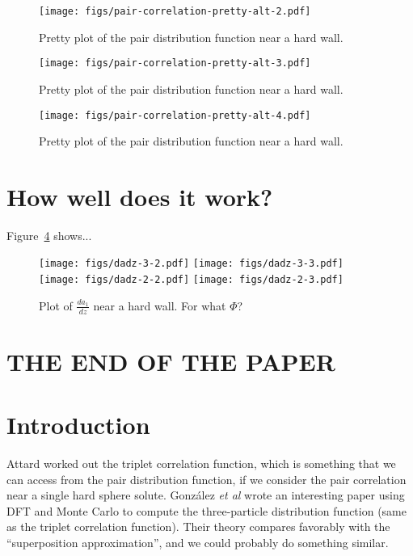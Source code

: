 \documentclass[letterpaper,twocolumn,amsmath,amssymb,pre]{revtex4-1}
\begin{document}
\begin{figure}
  \texttt{[image: figs/pair-correlation-pretty-alt-2.pdf]}
  \caption{Pretty plot of the pair distribution function near a hard
    wall.}\label{fig:pair-distribution-2}
\end{figure}
\begin{figure}
  \texttt{[image: figs/pair-correlation-pretty-alt-3.pdf]}
  \caption{Pretty plot of the pair distribution function near a hard
    wall.}\label{fig:pair-distribution-3}
\end{figure}
\begin{figure}
  \texttt{[image: figs/pair-correlation-pretty-alt-4.pdf]}
  \caption{Pretty plot of the pair distribution function near a hard
    wall.}\label{fig:pair-distribution-4}
\end{figure}

\section{How well does it work?}
Figure~\ref{fig:dadz} shows...
\begin{figure}
  \texttt{[image: figs/dadz-3-2.pdf]}
  \texttt{[image: figs/dadz-3-3.pdf]}
  \texttt{[image: figs/dadz-2-2.pdf]}
  \texttt{[image: figs/dadz-2-3.pdf]}
  \caption{Plot of $\frac{da_1}{dz}$ near a hard
    wall. For what $\Phi$?}\label{fig:dadz}
\end{figure}


\section{THE END OF THE PAPER}

\section{Introduction}

Attard worked out the triplet correlation function, which is something
that we can access from the pair distribution function, if we consider
the pair correlation near a single hard sphere
solute\cite{attard1989spherically}.  Gonz\'alez \emph{et al} wrote an
interesting paper using DFT and Monte Carlo to compute the
three-particle distribution function (same as the triplet correlation
function)\cite{gonzalez1999test}.  Their theory compares favorably
with the ``superposition approximation'', and we could probably do
something similar.
\end{document}
